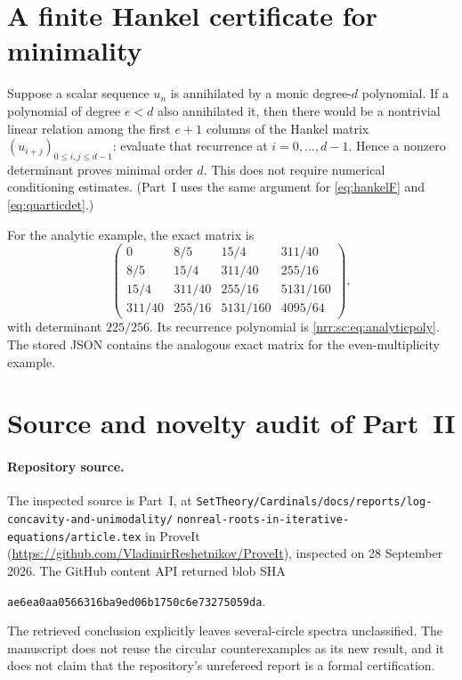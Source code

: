 \documentclass[11pt,letterpaper]{article}
\theoremstyle{definition}
\theoremstyle{remark}
\begin{document}
\section{A finite Hankel certificate for minimality}
\label{nrr:sc:app:hankel}

Suppose a scalar sequence $u_n$ is annihilated by a monic degree-$d$
polynomial. If a polynomial of degree $e<d$ also annihilated it, then
there would be a nontrivial linear relation among the first $e+1$ columns
of the Hankel matrix $(u_{i+j})_{0\le i,j\le d-1}$: evaluate that
recurrence at $i=0,\ldots,d-1$. Hence a nonzero determinant proves
minimal order $d$. This does not require numerical conditioning estimates.
(Part~I uses the same argument for \eqref{eq:hankelF}
and \eqref{eq:quarticdet}.)

For the analytic example, the exact matrix is
\[
 \begin{pmatrix}
 0&8/5&15/4&311/40\\
 8/5&15/4&311/40&255/16\\
 15/4&311/40&255/16&5131/160\\
 311/40&255/16&5131/160&4095/64
 \end{pmatrix},
\]
with determinant $225/256$.
Its recurrence polynomial is \eqref{nrr:sc:eq:analyticpoly}. The stored JSON
contains the analogous exact matrix for the even-multiplicity example.

\section{Source and novelty audit of Part~II}
\label{nrr:sc:app:audit}

\paragraph{Repository source.}
The inspected source is Part~I, at
\nolinkurl{SetTheory/Cardinals/docs/reports/log-concavity-and-unimodality/}
\nolinkurl{nonreal-roots-in-iterative-equations/article.tex} in ProveIt
(\url{https://github.com/VladimirReshetnikov/ProveIt}), inspected on
28 September 2026. The GitHub content API returned blob SHA
\begin{center}\small\texttt{ae6ea0aa0566316ba9ed06b1750c6e73275059da}.\end{center}
The retrieved conclusion explicitly leaves several-circle spectra
unclassified. The manuscript does not reuse the circular counterexamples
as its new result, and it does not claim that the repository's unrefereed
report is a formal certification.
\end{document}
